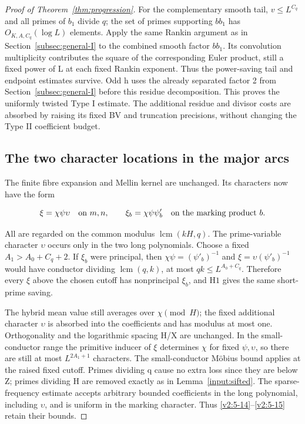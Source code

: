 \documentclass[11pt]{article}
\theoremstyle{definition}
\theoremstyle{remark}
\numberwithin{equation}{section}
\begin{document}
\begin{proof}[Proof of Theorem~\ref{thm:progression}]
For the complementary smooth tail, $v\le L^{C_q}$ and all primes of $b_1$ divide $q$; the set of primes supporting $bb_1$ has $O_{K,A,C_q}(\log L)$ elements. Apply the same Rankin argument as in Section~\ref{subsec:general-I} to the combined smooth factor $bb_1$. Its convolution multiplicity contributes the square of the corresponding Euler product, still a fixed power of L at each fixed Rankin exponent. Thus the power-saving tail and endpoint estimates survive. Odd h uses the already separated factor 2 from Section~\ref{subsec:general-I} before this residue decomposition. This proves the uniformly twisted Type I estimate. The additional residue and divisor costs are absorbed by raising its fixed BV and truncation precisions, without changing the Type II coefficient budget.

\subsection*{The two character locations in the major arcs}
The finite fibre expansion and Mellin kernel are unchanged. Its characters now have the form


\begin{equation}\label{v2:14-3}
\xi=\chi\psi\upsilon\quad\hbox{on }m,n,\qquad
\xi_b=\chi\psi\psi'_b\quad\hbox{on the marking product }b.
\end{equation}


All are regarded on the common modulus $\operatorname{lcm}(kH,q)$. The prime-variable character $\upsilon$ occurs only in the two long polynomials. Choose a fixed $A_1>A_0+C_q+2$. If $\xi_b$ were principal, then $\chi\psi=(\psi'_b)^{-1}$ and $\xi=\upsilon(\psi'_b)^{-1}$ would have conductor dividing $\operatorname{lcm}(q,k)$, at most $qk\le L^{A_0+C_q}$. Therefore every $\xi$ above the chosen cutoff has nonprincipal $\xi_b$, and $\mathrm H1$ gives the same short-prime saving.

The hybrid mean value still averages over $\chi\pmod H$; the fixed additional character $\upsilon$ is absorbed into the coefficients and has modulus at most one. Orthogonality and the logarithmic spacing H/X are unchanged. In the small-conductor range the primitive inducer of $\xi$ determines $\chi$ for fixed $\psi,\upsilon$, so there are still at most $L^{2A_1+1}$ characters. The small-conductor M\"obius bound applies at the raised fixed cutoff. Primes dividing q cause no extra loss since they are below Z; primes dividing H are removed exactly as in Lemma~\ref{input:sifted}. The sparse-frequency estimate accepts arbitrary bounded coefficients in the long polynomial, including $\upsilon$, and is uniform in the marking character. Thus \eqref{v2:5-14}–\eqref{v2:5-15} retain their bounds.


\end{proof}
\end{document}
